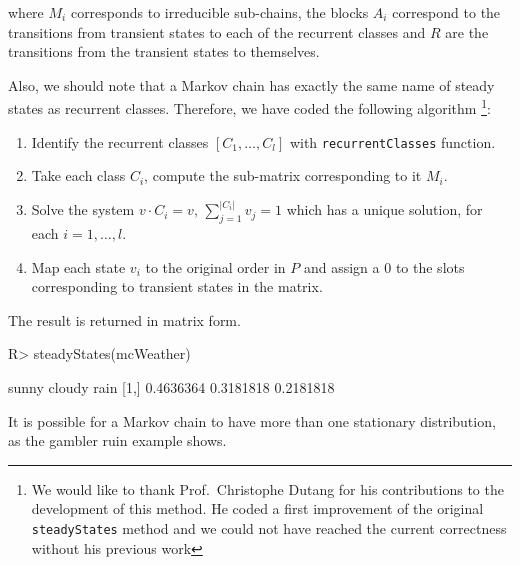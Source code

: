 \documentclass[
  nojss]{jss}
\providecommand{\tightlist}{%
  \setlength{\itemsep}{0pt}\setlength{\parskip}{0pt}}
\begin{document}
where \(M_i\) corresponds to irreducible sub-chains, the blocks \(A_i\) correspond to the transitions from transient states to each of the recurrent classes and \(R\) are the transitions from the transient states to themselves.

Also, we should note that a Markov chain has exactly the same name of steady states as recurrent classes. Therefore, we have coded the following algorithm \footnote{We would like to thank Prof.~Christophe Dutang for his contributions to the development of this method. He coded a first improvement of the original \texttt{steadyStates} method and we could not have reached the current correctness without his previous work}:

\begin{enumerate}
\def\labelenumi{\arabic{enumi}.}
\tightlist
\item
  Identify the recurrent classes \([C_1, \ldots, C_l]\) with \texttt{recurrentClasses} function.
\item
  Take each class \(C_i\), compute the sub-matrix corresponding to it \(M_i\).
\item
  Solve the system \(v \cdot C_i = v, \, \sum_{j = 1}^{|C_i|} v_j = 1\) which has a unique solution, for each \(i = 1, \ldots, l\).
\item
  Map each state \(v_i\) to the original order in \(P\) and assign a \(0\) to the slots corresponding to transient states in the matrix.
\end{enumerate}

The result is returned in matrix form.

\begin{CodeChunk}

\begin{CodeInput}
R> steadyStates(mcWeather)
\end{CodeInput}

\begin{CodeOutput}
         sunny    cloudy      rain
[1,] 0.4636364 0.3181818 0.2181818
\end{CodeOutput}
\end{CodeChunk}

It is possible for a Markov chain to have more than one stationary distribution, as the gambler ruin example shows.
\end{document}

